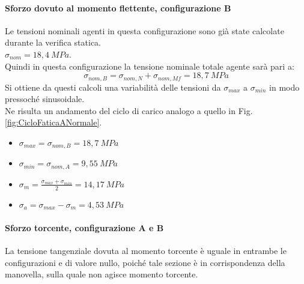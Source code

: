 \paragraph{Sforzo dovuto al momento flettente, configurazione B}Le tensioni nominali agenti in questa configurazione sono già state calcolate durante la verifica statica.\\
$\sigma_{nom}=18,4\ MPa$.\\
Quindi in questa configurazione la tensione nominale totale agente sarà pari a:
\begin{equation}
    \sigma_{nom,B}=\sigma_{nom,N}+\sigma_{nom,Mf}=18,7\ MPa
\end{equation}
Si ottiene da questi calcoli una variabilità delle tensioni da $\sigma_{max}$ a $\sigma_{min}$ in modo pressoché sinusoidale.\\
Ne risulta un andamento del ciclo di carico analogo a quello in Fig.\ref{fig:CicloFaticaANormale}.
\begin{itemize}
    \item $\sigma_{max}=\sigma_{nom,B}=18,7\ MPa$
    \item $\sigma_{min}=\sigma_{nom,A}=9,55\ MPa$
    \item $\sigma_m=\frac{\sigma_{max}+\sigma_{min}}{2}=14,17\ MPa$
    \item $\sigma_a=\sigma_{max}-\sigma_m=4,53\ MPa$
\end{itemize}
\paragraph{Sforzo torcente, configurazione A e B} La tensione tangenziale dovuta al momento torcente è uguale in entrambe le configurazioni e di valore nullo, poiché tale sezione è in corrispondenza della manovella, sulla quale non agisce momento torcente. 
